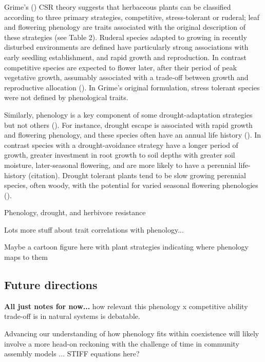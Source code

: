\documentclass[11pt]{article}
\begin{document}
 Grime’s (\citet{grime1977evidence}) CSR theory suggests that herbaceous plants can be classified according to three primary strategies, competitive, stress-tolerant or ruderal; leaf and flowering phenology are traits associated with the original description of these strategies (see Table 2). Ruderal species adapted to growing in recently disturbed environments are defined have particularly strong associations with early seedling establishment, and rapid growth and reproduction. In contrast competitive species are expected to flower later, after their period of peak vegetative growth, assumably associated with a trade-off between growth and reproductive allocation (\citet{law1979cost}). In Grime’s original formulation, stress tolerant species were not defined by phenological traits.

 Similarly, phenology is a key component of some drought-adaptation strategies but not others (\citet{kooyers2015evolution}). For instance, drought escape is associated with rapid growth and flowering phenology, and these species often have an annual life history (\citet{fox1992evolution}). In contrast species with a drought-avoidance strategy have a longer period of growth, greater investment in root growth to soil depths with greater soil moisture, later-seasonal flowering, and are more likely to have a perennial life-history (citation). Drought tolerant plants tend to be slow growing perennial species, often woody, with the potential for varied seasonal flowering phenologies (\citet{williams1997leaf}).

Phenology, drought, and herbivore resistance

Lots more stuff about trait correlations with phenology...

Maybe a cartoon figure here with plant strategies indicating where phenology maps to them

\subsection*{Future directions}

{\bf All just notes for now...}
 how relevant this phenology x competitive ability  trade-off is in natural systems is debatable. 
 
 Advancing our understanding of how phenology fits within coexistence will likely involve a more head-on reckoning with the challenge of time in community assembly models ... STIFF equations here? 

\end{document}
